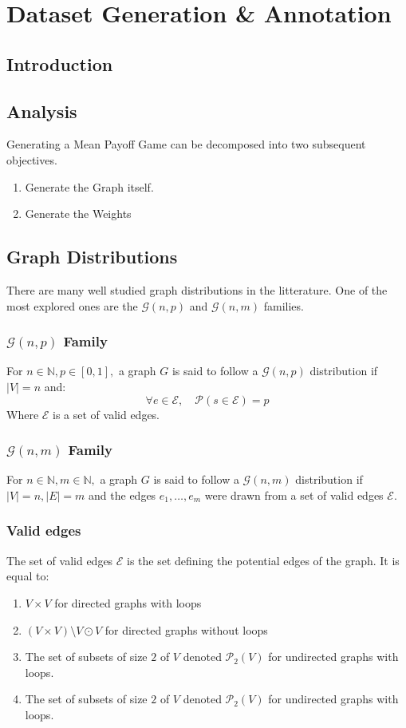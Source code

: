\chapter{Dataset Generation \& Annotation}
\label{section:Dataset}

\section{Introduction}
\section{Analysis}
Generating a Mean Payoff Game can be decomposed into two subsequent objectives.
\begin{enumerate}
	\item Generate the Graph itself.
	\item Generate the Weights
\end{enumerate}


\section{Graph Distributions}
There are many well studied graph distributions in the litterature. \newline
One of the most explored ones are the $\mathcal{G}(n,p)$ and $\mathcal{G}(n,m)$ families.
\subsection{$\mathcal{G}(n,p)$ Family}
For $n\in\mathbb{N},p\in[0,1],$ a graph $G$ is said to follow a $\mathcal{G}(n,p)$ distribution if $\lvert V \rvert=n$ and:
$$
\forall e\in \mathscr{E}, \quad \mathscr{P}(s\in \mathcal{E})=p
$$
Where $\mathscr{E}$ is a set of valid edges. 

\subsection{$\mathcal{G}(n,m)$ Family}
For $n\in\mathbb{N},m\in\mathbb{N},$ a graph $G$ is said to follow a $\mathcal{G}(n,m)$ distribution if $\lvert V \rvert=n,\lvert  E \rvert=m$ and the edges $e_1,\dots,e_m$ were drawn from a set of valid edges $\mathscr{E}.$
\subsection{Valid edges}
The set of valid edges $\mathscr{E}$ is the set defining the potential edges of the graph. It is equal to:
\begin{enumerate}
	\item $V\times V$ for directed graphs with loops 
	\item $(V\times V)\setminus V\odot V$ for directed graphs without loops
	\item The set of subsets of size $2$ of $V$ denoted $\mathscr{P}_2(V)$ for undirected graphs with loops.
	\item The set of subsets of size $2$ of $V$ denoted $\mathscr{P}_2(V)$ for undirected graphs with loops.
\end{enumerate}
